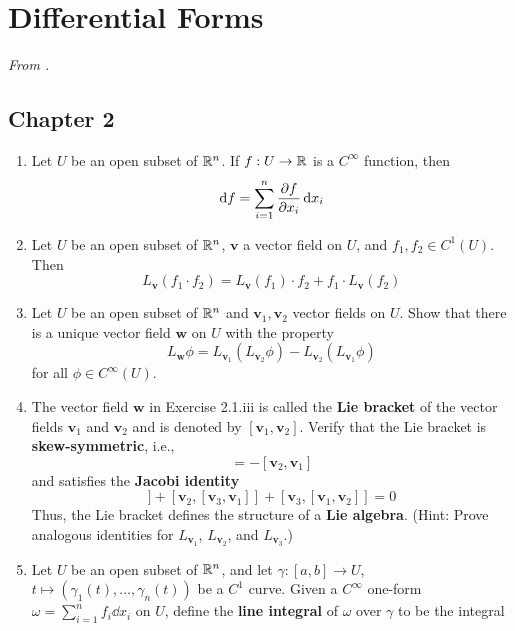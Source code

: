 \documentclass[../psets.tex]{subfiles}
\begin{document}
\section{Differential Forms}
\emph{From \textcite{bib:DifferentialForms}.}
\subsection*{Chapter 2}
\begin{enumerate}[label={\textbf{2.1.\roman*.}}]
    \item {}Let $U$ be an open subset of $\mathbb{R}^n$. If $f:U\to\mathbb{R}$ is a $C^\infty$ function, then
    \begin{equation*}
        \dd{f}=\sum_{i=1}^n\pdv{f}{x_i}\dd{x_i}
    \end{equation*}
    \item Let $U$ be an open subset of $\mathbb{R}^n$, $\bm{v}$ a vector field on $U$, and $f_1,f_2\in C^1(U)$. Then
    \begin{equation*}
        L_{\bm{v}}(f_1\cdot f_2) = L_{\bm{v}}(f_1)\cdot f_2+f_1\cdot L_{\bm{v}}(f_2)
    \end{equation*}
    \item Let $U$ be an open subset of $\mathbb{R}^n$ and $\bm{v}_1,\bm{v}_2$ vector fields on $U$. Show that there is a unique vector field $\bm{w}$ on $U$ with the property
    \begin{equation*}
        L_{\bm{w}}\phi = L_{\bm{v}_1}(L_{\bm{v}_2}\phi)-L_{\bm{v}_2}(L_{\bm{v}_1}\phi)
    \end{equation*}
    for all $\phi\in C^\infty(U)$.
    \item The vector field $\bm{w}$ in Exercise 2.1.iii is called the \textbf{Lie bracket} of the vector fields $\bm{v}_1$ and $\bm{v}_2$ and is denoted by $[\bm{v}_1,\bm{v}_2]$. Verify that the Lie bracket is \textbf{skew-symmetric}, i.e.,
    \begin{equation*}
        [\bm{v}_1,\bm{v}_2] = -[\bm{v}_2,\bm{v}_1]
    \end{equation*}
    and satisfies the \textbf{Jacobi identity}
    \begin{equation*}
        [\bm{v}_1,[\bm{v}_2,\bm{v}_3]]+[\bm{v}_2,[\bm{v}_3,\bm{v}_1]]+[\bm{v}_3,[\bm{v}_1,\bm{v}_2]] = 0
    \end{equation*}
    Thus, the Lie bracket defines the structure of a \textbf{Lie algebra}. (Hint: Prove analogous identities for $L_{\bm{v}_1}$, $L_{\bm{v}_2}$, and $L_{\bm{v}_3}$.)
    \setcounter{enumi}{6}
    \item Let $U$ be an open subset of $\mathbb{R}^n$, and let $\gamma:[a,b]\to U$, $t\mapsto(\gamma_1(t),\dots,\gamma_n(t))$ be a $C^1$ curve. Given a $C^\infty$ one-form $\omega=\sum_{i=1}^nf_i\dd{x_i}$ on $U$, define the \textbf{line integral} of $\omega$ over $\gamma$ to be the integral

\end{enumerate}
\end{document}
